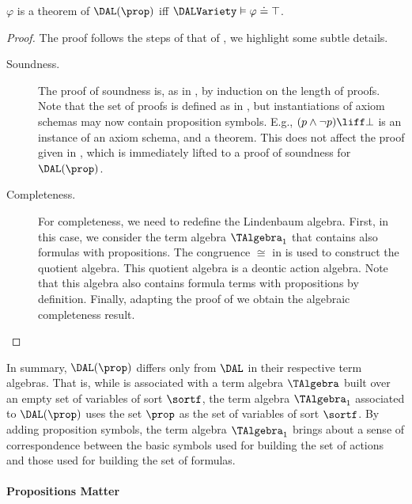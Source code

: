 \medskip
\begin{theorem}\label{prop:completeness:dal:prop} $\varphi$ is a theorem of $\DAL(\prop)$ iff $\DALVariety \vDash {\varphi \doteq \top}$.
\end{theorem}
\begin{proof} The proof follows the steps of that of  ,  we highlight some subtle details.  

\medskip 
	\begin{description}
		\item[Soundness.]
		The proof of soundness is, as in , by induction on the length of proofs.
		Note that the set of proofs is defined as in , but instantiations of axiom schemas may now contain proposition symbols. E.g.,  $(p \land \lnot p) \liff \bot$ is an instance of an axiom schema, and a theorem. This does not affect the proof given in , which is immediately lifted to a proof of soundness for ${\DAL(\prop)}$.

		\item[Completeness.]
		For completeness, we need to redefine the Lindenbaum algebra.
		First, in this case, we consider the term algebra $\TAlgebra_1$ that contains also formulas with propositions. The congruence $\cong$ in  is used to construct the quotient algebra. This quotient algebra is a deontic action algebra. Note that this algebra also contains formula terms with propositions by definition. Finally, adapting the proof of  we obtain the algebraic completeness result.
		\qedhere
	\end{description}
\end{proof}
\medskip

In summary, $\DAL(\prop)$ differs only from $\DAL$ in their respective term algebras.
That is, while \DAL is associated with a term algebra $\TAlgebra$ built over an empty set of variables of sort $\sortf$, the term algebra $\TAlgebra_1$ associated to $\DAL(\prop)$ uses the set $\prop$ as the set of variables of sort $\sortf$.
By adding proposition symbols, the term algebra $\TAlgebra_1$ brings about a sense of correspondence between the basic symbols used for building the set of actions and those used for building the set of formulas.

\paragraph{Propositions Matter}

